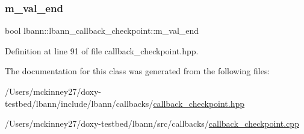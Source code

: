 \subsubsection{\texorpdfstring{m\+\_\+val\+\_\+end}{m\_val\_end}}
{\footnotesize\ttfamily bool lbann\+::lbann\+\_\+callback\+\_\+checkpoint\+::m\+\_\+val\+\_\+end\hspace{0.3cm}{\ttfamily [protected]}}



Definition at line 91 of file callback\+\_\+checkpoint.\+hpp.



The documentation for this class was generated from the following files\+:\begin{DoxyCompactItemize}
\item 
/\+Users/mckinney27/doxy-\/testbed/lbann/include/lbann/callbacks/\hyperlink{callback__checkpoint_8hpp}{callback\+\_\+checkpoint.\+hpp}\item 
/\+Users/mckinney27/doxy-\/testbed/lbann/src/callbacks/\hyperlink{callback__checkpoint_8cpp}{callback\+\_\+checkpoint.\+cpp}\end{DoxyCompactItemize}
